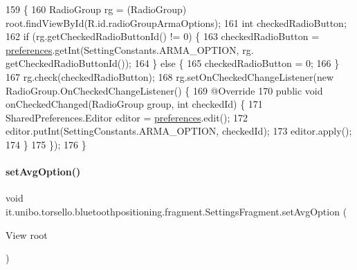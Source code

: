 \begin{DoxyCode}
159                                           \{
160         RadioGroup rg = (RadioGroup) root.findViewById(R.id.radioGroupArmaOptions);
161         \textcolor{keywordtype}{int} checkedRadioButton;
162         \textcolor{keywordflow}{if} (rg.getCheckedRadioButtonId() != 0) \{
163             checkedRadioButton = \hyperlink{classit_1_1unibo_1_1torsello_1_1bluetoothpositioning_1_1fragment_1_1SettingsFragment_a52480c4d5d81ca59fe4a98ae3c623ea4_a52480c4d5d81ca59fe4a98ae3c623ea4}{preferences}.getInt(SettingConstants.ARMA\_OPTION, rg.
      getCheckedRadioButtonId());
164         \} \textcolor{keywordflow}{else} \{
165             checkedRadioButton = 0;
166         \}
167         rg.check(checkedRadioButton);
168         rg.setOnCheckedChangeListener(\textcolor{keyword}{new} RadioGroup.OnCheckedChangeListener() \{
169             @Override
170             \textcolor{keyword}{public} \textcolor{keywordtype}{void} onCheckedChanged(RadioGroup group, \textcolor{keywordtype}{int} checkedId) \{
171                 SharedPreferences.Editor editor = \hyperlink{classit_1_1unibo_1_1torsello_1_1bluetoothpositioning_1_1fragment_1_1SettingsFragment_a52480c4d5d81ca59fe4a98ae3c623ea4_a52480c4d5d81ca59fe4a98ae3c623ea4}{preferences}.edit();
172                 editor.putInt(SettingConstants.ARMA\_OPTION, checkedId);
173                 editor.apply();
174             \}
175         \});
176     \}
\end{DoxyCode}
\hypertarget{classit_1_1unibo_1_1torsello_1_1bluetoothpositioning_1_1fragment_1_1SettingsFragment_a0f26c84f3a3dfffabfed1db04303b8b0_a0f26c84f3a3dfffabfed1db04303b8b0}{}\label{classit_1_1unibo_1_1torsello_1_1bluetoothpositioning_1_1fragment_1_1SettingsFragment_a0f26c84f3a3dfffabfed1db04303b8b0_a0f26c84f3a3dfffabfed1db04303b8b0} 
\paragraph{\texorpdfstring{set\+Avg\+Option()}{setAvgOption()}}
{\footnotesize\ttfamily void it.\+unibo.\+torsello.\+bluetoothpositioning.\+fragment.\+Settings\+Fragment.\+set\+Avg\+Option (\begin{DoxyParamCaption}\item[{View}]{root }\end{DoxyParamCaption})\hspace{0.3cm}{\ttfamily [private]}}


